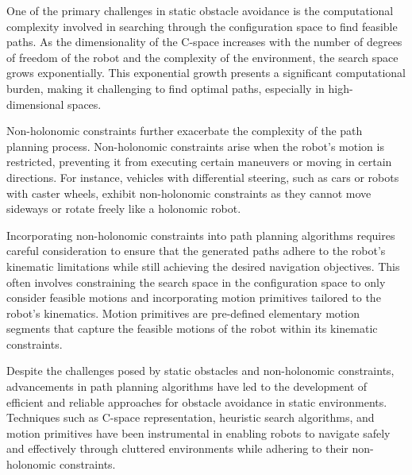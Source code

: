 \vspace*{6mm}

One of the primary challenges in static obstacle avoidance is the computational complexity involved in searching through the configuration space to find feasible paths. As the dimensionality of the C-space increases with the number of degrees of freedom of the robot and the complexity of the environment, the search space grows exponentially. This exponential growth presents a significant computational burden, making it challenging to find optimal paths, especially in high-dimensional spaces.

\vspace*{6mm}

Non-holonomic constraints further exacerbate the complexity of the path planning process. Non-holonomic constraints arise when the robot's motion is restricted, preventing it from executing certain maneuvers or moving in certain directions. For instance, vehicles with differential steering, such as cars or robots with caster wheels, exhibit non-holonomic constraints as they cannot move sideways or rotate freely like a holonomic robot.

\vspace*{6mm}

Incorporating non-holonomic constraints into path planning algorithms requires careful consideration to ensure that the generated paths adhere to the robot's kinematic limitations while still achieving the desired navigation objectives. This often involves constraining the search space in the configuration space to only consider feasible motions and incorporating motion primitives tailored to the robot's kinematics. Motion primitives are pre-defined elementary motion segments that capture the feasible motions of the robot within its kinematic constraints.

\vspace*{6mm}

Despite the challenges posed by static obstacles and non-holonomic constraints, advancements in path planning algorithms have led to the development of efficient and reliable approaches for obstacle avoidance in static environments. Techniques such as C-space representation, heuristic search algorithms, and motion primitives have been instrumental in enabling robots to navigate safely and effectively through cluttered environments while adhering to their non-holonomic constraints.

\vspace*{6mm}

